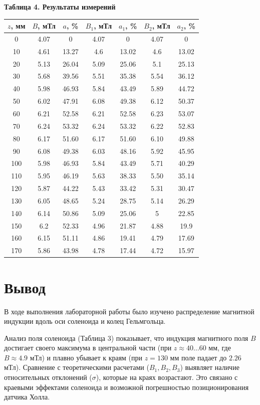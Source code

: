 \documentclass[a4paper,14pt]{extarticle}
\begin{document}
\begin{center}
\small
\textbf{Таблица 4. Результаты измерений}
\begin{tabular}{|c|c|c|c|c|c|c|}
\hline
$z$, мм & $B$, мТл & $a$, \% & $B_1$, мТл & $a_1$, \% & $B_2$, мТл & $a_2$, \% \\
\hline
0 & 4.07 & 0 & 4.07 & 0 & 4.07 & 0 \\ \hline
10 & 4.61 & 13.27 & 4.6 & 13.02 & 4.6 & 13.02 \\ \hline
20 & 5.13 & 26.04 & 5.09 & 25.06 & 5.1 & 25.13 \\ \hline
30 & 5.68 & 39.56 & 5.51 & 35.38 & 5.54 & 36.12 \\ \hline
40 & 5.98 & 46.93 & 5.84 & 43.49 & 5.89 & 44.72 \\ \hline
50 & 6.02 & 47.91 & 6.08 & 49.38 & 6.12 & 50.37 \\ \hline
60 & 6.21 & 52.58 & 6.21 & 52.58 & 6.23 & 53.07 \\ \hline
70 & 6.24 & 53.32 & 6.24 & 53.32 & 6.22 & 52.83 \\ \hline
80 & 6.17 & 51.60 & 6.17 & 51.60 & 6.10 & 49.88 \\ \hline
90 & 6.08 & 49.38 & 6.03 & 48.16 & 5.92 & 45.95 \\ \hline
100 & 5.98 & 46.93 & 5.84 & 43.49 & 5.71 & 40.29 \\ \hline
110 & 5.95 & 46.19 & 5.63 & 38.33 & 5.50 & 35.14 \\ \hline
120 & 5.87 & 44.22 & 5.43 & 33.42 & 5.31 & 30.47 \\ \hline
130 & 6.05 & 48.65 & 5.24 & 28.75 & 5.14 & 26.29 \\ \hline
140 & 6.14 & 50.86 & 5.09 & 25.06 & 5 & 22.85 \\ \hline
150 & 6.2 & 52.33 & 4.96 & 21.87 & 4.88 & 19.9 \\ \hline
160 & 6.15 & 51.11 & 4.86 & 19.41 & 4.79 & 17.69 \\ \hline
170 & 5.86 & 43.98 & 4.78 & 17.44 & 4.72 & 15.97 \\ \hline
\end{tabular}
\end{center}

\section*{Вывод}
В ходе выполнения лабораторной работы было изучено распределение магнитной индукции вдоль оси соленоида и колец Гельмгольца. 

Анализ поля соленоида (Таблица 3) показывает, что индукция магнитного поля $B$ достигает своего максимума в центральной части (при $z \approx 40 \dots 60$ мм, где $B \approx 4.9$ мТл) и плавно убывает к краям (при $z = 130$ мм поле падает до $2.26$ мТл). Сравнение с теоретическими расчетами ($B_1, B_2, B_3$) выявляет наличие относительных отклонений ($\sigma$), которые на краях возрастают. Это связано с краевыми эффектами соленоида и возможной погрешностью позиционирования датчика Холла.
\end{document}
